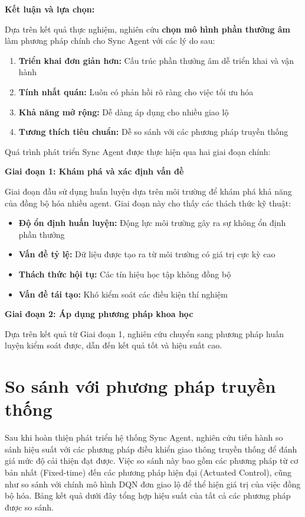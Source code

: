 \textbf{Kết luận và lựa chọn:}

Dựa trên kết quả thực nghiệm, nghiên cứu \textbf{chọn mô hình phần thưởng âm} làm phương pháp chính cho Sync Agent với các lý do sau:

\begin{enumerate}
    \item \textbf{Triển khai đơn giản hơn:} Cấu trúc phần thưởng âm dễ triển khai
        và vận hành
    \item \textbf{Tính nhất quán:} Luôn có phản hồi rõ ràng cho việc tối ưu hóa

    \item \textbf{Khả năng mở rộng:} Dễ dàng áp dụng cho nhiều giao lộ

    \item \textbf{Tương thích tiêu chuẩn:} Dễ so sánh với các phương pháp
        truyền thống
\end{enumerate}


Quá trình phát triển Sync Agent được thực hiện qua hai giai đoạn chính:

\textbf{Giai đoạn 1: Khám phá và xác định vấn đề}

Giai đoạn đầu sử dụng huấn luyện dựa trên môi trường để khám phá khả năng của
đồng bộ hóa nhiều agent. Giai đoạn này cho thấy các thách thức kỹ thuật:

\begin{itemize}
    \item \textbf{Độ ổn định huấn luyện:} Động lực môi trường gây ra sự không ổn định phần thưởng
    \item \textbf{Vấn đề tỷ lệ:} Dữ liệu được tạo ra từ môi trường có giá trị cực kỳ cao
    \item \textbf{Thách thức hội tụ:} Các tín hiệu học tập không đồng bộ
    \item \textbf{Vấn đề tái tạo:} Khó kiểm soát các điều kiện thí nghiệm
\end{itemize}

\textbf{Giai đoạn 2: Áp dụng phương pháp khoa học}

Dựa trên kết quả từ Giai đoạn 1, nghiên cứu chuyển sang phương pháp huấn luyện kiểm soát
được, dẫn đến kết quả tốt và hiệu suất cao.

\section{So sánh với phương pháp truyền thống}
Sau khi hoàn thiện phát triển hệ thống Sync Agent, nghiên cứu tiến hành so sánh hiệu suất với các phương pháp điều khiển giao thông truyền thống để đánh giá mức độ cải thiện đạt được. Việc so sánh này bao gồm các phương pháp từ cơ bản nhất (Fixed-time) đến các phương pháp hiện đại (Actuated Control), cũng như so sánh với chính mô hình DQN đơn giao lộ để thể hiện giá trị của việc đồng bộ hóa. Bảng kết quả dưới đây tổng hợp hiệu suất của tất cả các phương pháp được so sánh.

